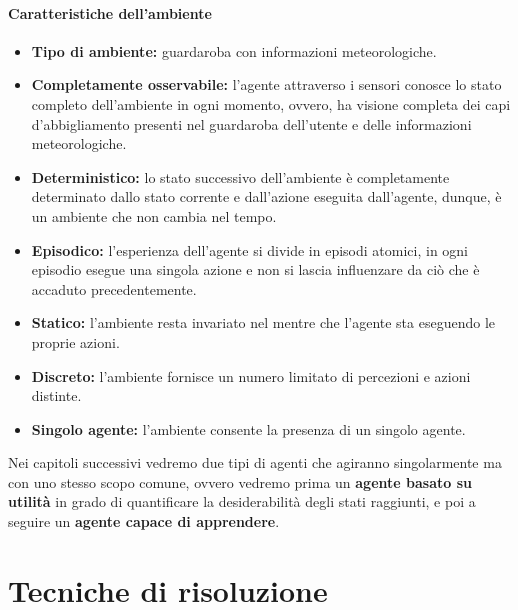 \documentclass[a4paper, 11pt, oneside]{report}
\begin{document}
            \subsection{Caratteristiche dell'ambiente}
                \begin{itemize}
                    \item \textbf{Tipo di ambiente:} guardaroba con informazioni meteorologiche.
                    \item \textbf{Completamente osservabile:} l'agente attraverso i sensori conosce lo stato
                    completo dell'ambiente in ogni momento, ovvero, ha visione completa dei capi d'abbigliamento presenti
                    nel guardaroba dell'utente e delle informazioni meteorologiche.
                    \item \textbf{Deterministico:} lo stato successivo dell'ambiente è completamente determinato dallo
                    stato corrente e dall'azione eseguita dall'agente, dunque, è un ambiente che non cambia nel tempo.
                    \item \textbf{Episodico:} l'esperienza dell'agente si divide in episodi atomici, in ogni episodio
                    esegue una singola azione e non si lascia influenzare da ciò che è accaduto precedentemente.
                    \item \textbf{Statico:} l'ambiente resta invariato nel mentre che l'agente sta eseguendo le proprie azioni.
                    \item \textbf{Discreto:} l'ambiente fornisce un numero limitato di percezioni e azioni distinte.
                    \item \textbf{Singolo agente:} l'ambiente consente la presenza di un singolo agente.
                \end{itemize}
                \bigskip
                \par \noindent Nei capitoli successivi vedremo due tipi di agenti che agiranno singolarmente ma con uno stesso
                scopo comune, ovvero vedremo prima un \textbf{agente basato su utilità} in grado di quantificare la desiderabilità
                degli stati raggiunti, e poi a seguire un \textbf{agente capace di apprendere}.

    \part{Tecniche di risoluzione}
\end{document}
